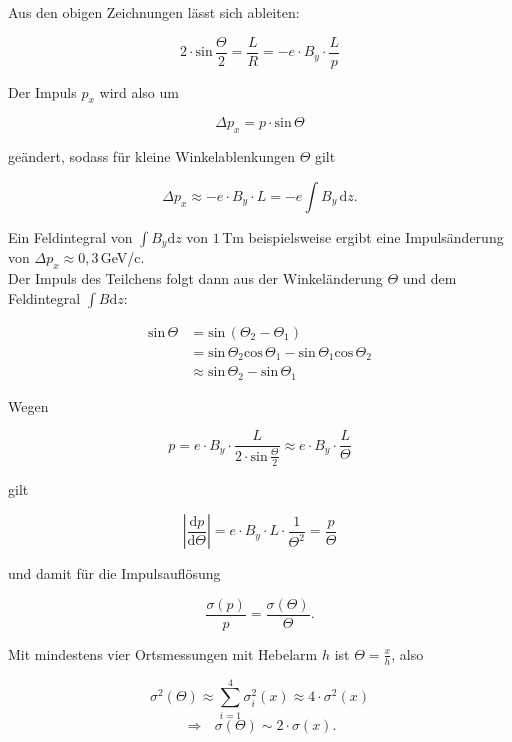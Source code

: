 \begin{figure}[H]
		\centering
		
\end{figure}

\begin{figure}[H]
		\centering
		
\end{figure}

Aus den obigen Zeichnungen lässt sich ableiten: 

\[ 2\cdot \text{sin}\,\frac{\Theta}{2} = \frac{L}{R} = -e\cdot B_y\cdot \frac{L}{p} \]

Der Impuls $p_x$ wird also um 

\[ \Delta p_x = p\cdot \text{sin}\,\Theta \]

geändert, sodass für kleine Winkelablenkungen $\Theta$ gilt

\[ \Delta p_x \approx -e\cdot B_y\cdot L = -e \int B_y \,\mathrm{d}z.\]

Ein Feldintegral von $\int B_y \mathrm{d}z$ von $1\,$Tm beispielsweise ergibt eine Impulsänderung
von $\Delta p_x \approx 0{,}3\,$GeV/c.
\\
Der Impuls des Teilchens folgt dann aus der Winkeländerung $\Theta$ und dem Feldintegral $\int B
\mathrm{d}z$:

\begin{align*}
\text{sin}\,\Theta &= \text{sin}\,(\Theta_2-\Theta_1) \\
&= \text{sin}\,\Theta_2\text{cos}\,\Theta_1-\text{sin}\,\Theta_1\text{cos}\,\Theta_2 \\
&\approx \text{sin}\,\Theta_2-\text{sin}\,\Theta_1
\end{align*}


Wegen

\[p=e\cdot B_y\cdot \frac{L}{2\cdot \text{sin}\,\frac{\Theta}{2}} \approx e\cdot B_y\cdot
\frac{L}{\Theta}
\]

gilt

\[ \left| \frac{\mathrm{d}p}{\mathrm{d}\Theta} \right| =e\cdot B_y\cdot L \cdot \frac{1}{\Theta^2} =
\frac{p}{\Theta} \]

und damit für die Impulsauflösung

\[ \frac{\sigma(p)}{p}  = \frac{\sigma(\Theta)}{\Theta}. \]

Mit mindestens vier Ortsmessungen mit Hebelarm $h$ ist $\Theta=\frac{x}{h}$, also

\[\sigma^2(\Theta) \approx \sum_{i=1}^4 \sigma_i^2(x) \approx 4\cdot \sigma^2(x)  \]
\[\Rightarrow~~~ \sigma(\Theta) \sim 2\cdot\sigma(x). \]

